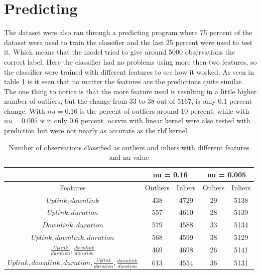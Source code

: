 \section{Predicting}
The dataset were also ran through a predicting program where 75 percent of the dataset were used to train the classifier and the last 25 percent were used to test it. Which means that the model tried to give around 5000 observations the correct label. Here the classifier had no problems using more then two features, so the classifier were trained with different features to see how it worked. As seen in table \ref{tab:predicting} is it seen that no matter the features are the predictions quite similar. The one thing to notice is that the more feature used is resulting in a little higher number of outliers, but the change from 33 to 38 out of 5167, is only 0.1 percent change. With $nu = 0.16$ is the percent of outliers around 10 percent, while with $nu = 0.005$ is it only 0.6 percent. \gls{ocsvm} with linear kernel were also tested with prediction but were not nearly as accurate as the rbf kernel. 

\begin{table}
\centering
\begin{tabular}[b]{|c|c|c|c|c|}
\hline
 & \multicolumn{2}{c}{nu = 0.16} & \multicolumn{2}{c}{nu = 0.005} \\ \hline
Features & Outliers & Inliers & Ouliers & Inliers \\ \hline
$Uplink, downlink$ & 438 & 4729 & 29 & 5138 \\ \hline
$Uplink, duration$ & 557 & 4610 & 28 & 5139 \\ \hline
$Downlink, duration$ & 579 & 4588 & 33 & 5134 \\ \hline
$Uplink, downlink, duration$ & 568 & 4599 & 38 & 5129 \\ \hline
$\frac{Uplink}{duration}, \frac{downlink}{duration }$ & 469 & 4698 & 26 & 5141 \\ \hline
$Uplink, downlink, duration, \frac{Uplink}{duration}, \frac{downlink}{duration }$ & 613 & 4554 & 36 & 5131 \\ \hline
\end{tabular}
\caption{\label{tab:predicting} Number of observations classified as outliers and inliers with different features and nu value} 
\end{table} 